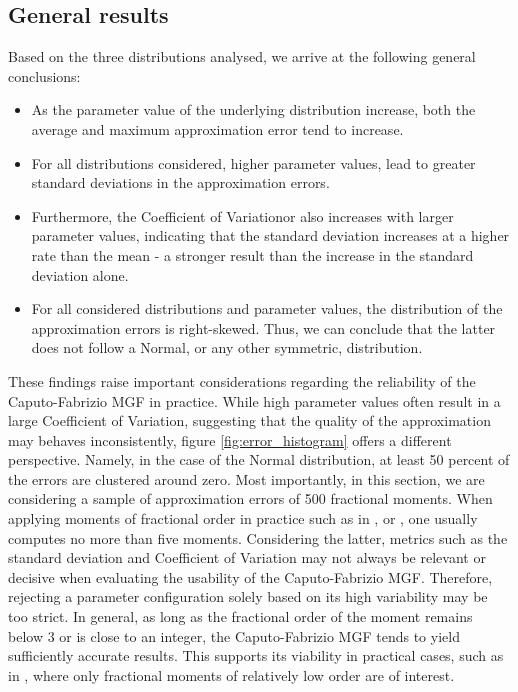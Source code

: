 \subsection{General results}
Based on the three distributions analysed, we arrive at the following  general conclusions:
\begin{itemize}
    \item As the parameter value of the underlying distribution increase, both the average and maximum approximation error tend to increase.
    \item For all distributions considered, higher parameter values, lead to greater standard deviations in the approximation errors.
    \item Furthermore, the Coefficient of Variationor also increases with larger parameter values, indicating that the standard deviation increases at a higher rate than the mean - a stronger result than the increase in the standard deviation alone.
    \item For all considered distributions and parameter values, the distribution of the approximation errors is right-skewed. Thus, we can conclude that the latter does not follow a Normal, or any other symmetric, distribution.
\end{itemize}
These findings raise important considerations regarding the reliability of the Caputo-Fabrizio MGF in practice. While high parameter values often result in a large Coefficient of Variation, suggesting that the quality of the approximation may behaves inconsistently, figure \ref{fig:error_histogram} offers a different perspective. Namely, in the case of the Normal distribution, at least 50 percent of the errors are clustered around zero. Most importantly, in this section, we are considering a sample of approximation errors of 500 fractional moments. When applying moments of fractional order in practice such as in \cite{hansen2024}, \cite{Mikosc2013} or \cite{gyzl2013}, one usually computes no more than five moments. Considering the latter, metrics such as the standard deviation and Coefficient of Variation may not always be relevant or decisive when evaluating the usability of the Caputo-Fabrizio MGF. Therefore, rejecting a parameter configuration solely based on its high variability may be too strict. In general, as long as the fractional order of the moment remains below 3 or is close to an integer, the Caputo-Fabrizio MGF tends to yield sufficiently accurate results. This supports its viability in practical cases, such as in \cite{hansen2024}, where only fractional moments of relatively low order are of interest.
